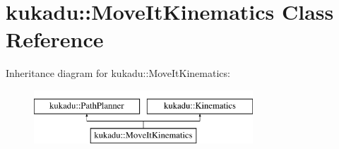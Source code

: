 \hypertarget{classkukadu_1_1MoveItKinematics}{\section{kukadu\-:\-:Move\-It\-Kinematics Class Reference}
\label{classkukadu_1_1MoveItKinematics}
}
Inheritance diagram for kukadu\-:\-:Move\-It\-Kinematics\-:\begin{figure}[H]
\begin{center}
\leavevmode
\includegraphics[height=2.000000cm]{classkukadu_1_1MoveItKinematics}
\end{center}
\end{figure}
